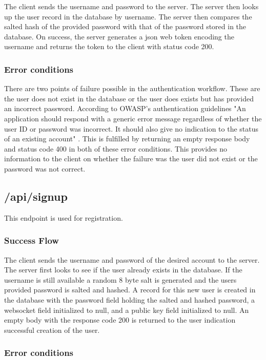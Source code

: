 The client sends the username and password to the server. The server then looks up the user record in the database by username. The server then compares the salted hash of the provided password with that of the password stored in the database. On success, the server generates a json web token encoding the username and returns the token to the client with status code 200.


\subsubsection{Error conditions}


There are two points of failure possible in the authentication workflow. These are the user does not exist in the database or the user does exists but has provided an incorrect password. According to OWASP's authentication guidelines "An application should respond with a generic error message regardless of whether the user ID or password was incorrect. It should also give no indication to the status of an existing account" \cite{owasp-auth}. This is fulfilled by returning an empty response body and status code 400 in both of these error conditions. This provides no information to the client on whether the failure was the user did not exist or the password was not correct. 


\subsection{/api/signup}


This endpoint is used for registration.


\subsubsection{Success Flow}


The client sends the username and password of the desired account to the server. The server first looks to see if the user already exists in the database. If the username is still available a random 8 byte salt is generated and the users provided password is salted and hashed. A record for this new user is created in the database with the password field holding the salted and hashed password, a websocket field initialized to null, and a public key field initialized to null. An empty body with the response code 200 is returned to the user indication successful creation of the user.


\subsubsection{Error conditions}


